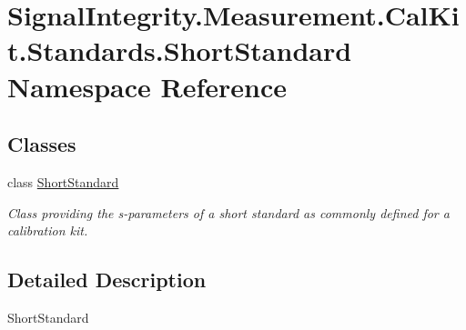 \hypertarget{namespaceSignalIntegrity_1_1Measurement_1_1CalKit_1_1Standards_1_1ShortStandard}{}\section{Signal\+Integrity.\+Measurement.\+Cal\+Kit.\+Standards.\+Short\+Standard Namespace Reference}
\label{namespaceSignalIntegrity_1_1Measurement_1_1CalKit_1_1Standards_1_1ShortStandard}
\subsection*{Classes}
\begin{DoxyCompactItemize}
\item 
class \hyperlink{classSignalIntegrity_1_1Measurement_1_1CalKit_1_1Standards_1_1ShortStandard_1_1ShortStandard}{Short\+Standard}
\begin{DoxyCompactList}\small\item\em Class providing the s-\/parameters of a short standard as commonly defined for a calibration kit. \end{DoxyCompactList}\end{DoxyCompactItemize}


\subsection{Detailed Description}
\begin{DoxyVerb}ShortStandard\end{DoxyVerb}
 